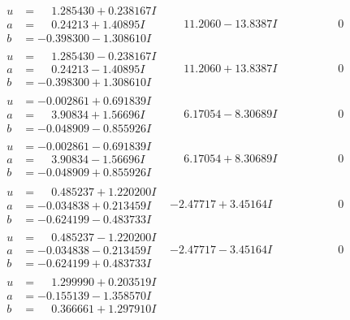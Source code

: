 \documentclass[1p]{elsarticle_modified}
\theoremstyle{definition}
\begin{document}
$$\begin{array}{c|c|c}
\begin{aligned}
u &= \phantom{-}1.285430 + 0.238167 I \\
a &= \phantom{-}0.24213 + 1.40895 I \\
b &= -0.398300 - 1.308610 I\end{aligned}
 & \phantom{-}11.2060 - 13.8387 I & \phantom{-0.000000 } 0 \\ \hline\begin{aligned}
u &= \phantom{-}1.285430 - 0.238167 I \\
a &= \phantom{-}0.24213 - 1.40895 I \\
b &= -0.398300 + 1.308610 I\end{aligned}
 & \phantom{-}11.2060 + 13.8387 I & \phantom{-0.000000 } 0 \\ \hline\begin{aligned}
u &= -0.002861 + 0.691839 I \\
a &= \phantom{-}3.90834 + 1.56696 I \\
b &= -0.048909 - 0.855926 I\end{aligned}
 & \phantom{-}6.17054 - 8.30689 I & \phantom{-0.000000 } 0 \\ \hline\begin{aligned}
u &= -0.002861 - 0.691839 I \\
a &= \phantom{-}3.90834 - 1.56696 I \\
b &= -0.048909 + 0.855926 I\end{aligned}
 & \phantom{-}6.17054 + 8.30689 I & \phantom{-0.000000 } 0 \\ \hline\begin{aligned}
u &= \phantom{-}0.485237 + 1.220200 I \\
a &= -0.034838 + 0.213459 I \\
b &= -0.624199 - 0.483733 I\end{aligned}
 & -2.47717 + 3.45164 I & \phantom{-0.000000 } 0 \\ \hline\begin{aligned}
u &= \phantom{-}0.485237 - 1.220200 I \\
a &= -0.034838 - 0.213459 I \\
b &= -0.624199 + 0.483733 I\end{aligned}
 & -2.47717 - 3.45164 I & \phantom{-0.000000 } 0 \\ \hline\begin{aligned}
u &= \phantom{-}1.299990 + 0.203519 I \\
a &= -0.155139 - 1.358570 I \\
b &= \phantom{-}0.366661 + 1.297910 I\end{aligned}

\end{array}$$
\end{document}
